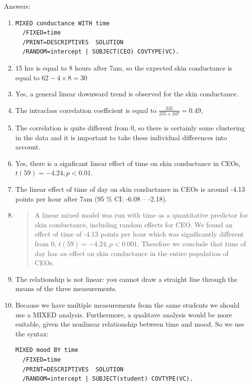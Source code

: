 \documentclass[]{report}\usepackage[]{graphicx}\usepackage[]{color}
\begin{document}
Answers:
\begin{enumerate}
\item 
\begin{verbatim}
MIXED conductance WITH time
  /FIXED=time
  /PRINT=DESCRIPTIVES  SOLUTION
  /RANDOM=intercept | SUBJECT(CEO) COVTYPE(VC).
\end{verbatim}
\item 15 hrs is equal to 8 hours after 7am, so the expected skin conductance is equal to $62 - 4 \times 8= 30$\\
\item Yes, a general linear downward trend is observed for the skin conductance.
\item The intraclass correlation coefficient is equal to $\frac{235}{235+247}=0.49$, 
\item The correlation is quite different from 0, so there is certainly some clustering in the data and it is important to take these individual differences into account. \\
\item Yes, there is a signficant linear effect of time on skin conductance in CEOs, $t(59)=-4.24, p < 0.01$.\\
\item The linear effect of time of day on skin conductance in CEOs is around -4.13 points per hour after 7am (95 \% CI: -6.08 -- -2.18). \\
\item \begin{quotation}
        A linear mixed model was run with time as a quantitative predictor for skin conductance, including random effects for CEO. We found an effect of time of -4.13 points per hour which was significantly different from 0, $t(59)=-4.24, p < 0.001$. Therefore we conclude that time of day has an effect on skin conductance in the entire population of CEOs.
        \end{quotation}
        
\item The relationship is not linear: you cannot draw a straight line through the means of the three measurements. 
\item Because we have multiple measurements from the same students we should use a MIXED analysis. Furthermore, a qualitave analysis would be more suitable, given the nonlinear relationship between time and mood. So we use the syntax:

\begin{verbatim}
MIXED mood BY time
  /FIXED=time
  /PRINT=DESCRIPTIVES  SOLUTION
  /RANDOM=intercept | SUBJECT(student) COVTYPE(VC).
\end{verbatim}

\end{enumerate}
\end{document}
